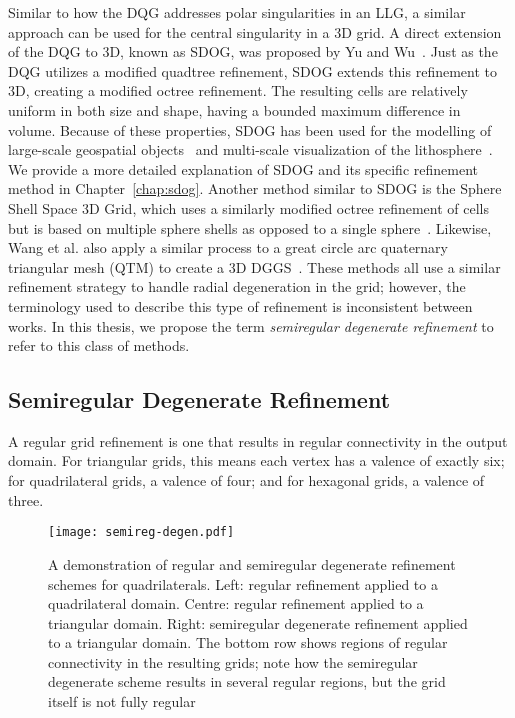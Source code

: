 Similar to how the DQG addresses polar singularities in an LLG, a similar approach can be used for the central singularity in a 3D grid.
A direct extension of the DQG to 3D, known as SDOG, was proposed by Yu and Wu~\cite{yu2009sdog}.
Just as the DQG utilizes a modified quadtree refinement, SDOG extends this refinement to 3D, creating a modified octree refinement.
The resulting cells are relatively uniform in both size and shape, having a bounded maximum difference in volume.
Because of these properties, SDOG has been used for the modelling of large-scale geospatial objects~\cite{yu2012large-scale} and multi-scale visualization of the lithosphere~\cite{yu2012lithosphere}.
We provide a more detailed explanation of SDOG and its specific refinement method in Chapter~\ref{chap:sdog}.
Another method similar to SDOG is the Sphere Shell Space 3D Grid, which uses a similarly modified octree refinement of cells but is based on multiple sphere shells as opposed to a single sphere~\cite{gang2013sphere}.
Likewise, Wang et al. also apply a similar process to a great circle arc quaternary triangular mesh (QTM) to create a 3D DGGS~\cite{wang2013global}.
These methods all use a similar refinement strategy to handle radial degeneration in the grid; however, the terminology used to describe this type of refinement is inconsistent between works.
In this thesis, we propose the term \textit{semiregular degenerate refinement} to refer to this class of methods.


\subsection{Semiregular Degenerate Refinement} \label{chap:3:semiregDegen}
A regular grid refinement is one that results in regular connectivity in the output domain.
For triangular grids, this means each vertex has a valence of exactly six; for quadrilateral grids, a valence of four; and for hexagonal grids, a valence of three.


\begin{figure}[ht!]
	\centering
	\texttt{[image: semireg-degen.pdf]}
	\caption[Comparison of regular and semiregular degenerate refinement]{
		A demonstration of regular and semiregular degenerate refinement schemes for quadrilaterals.
		Left: regular refinement applied to a quadrilateral domain.
		Centre: regular refinement applied to a triangular domain.
		Right: semiregular degenerate refinement applied to a triangular domain.
		The bottom row shows regions of regular connectivity in the resulting grids; note how the semiregular degenerate scheme results in several regular regions, but the grid itself is not fully regular
	}
	\label{fig:semireg-degen}
\end{figure}


